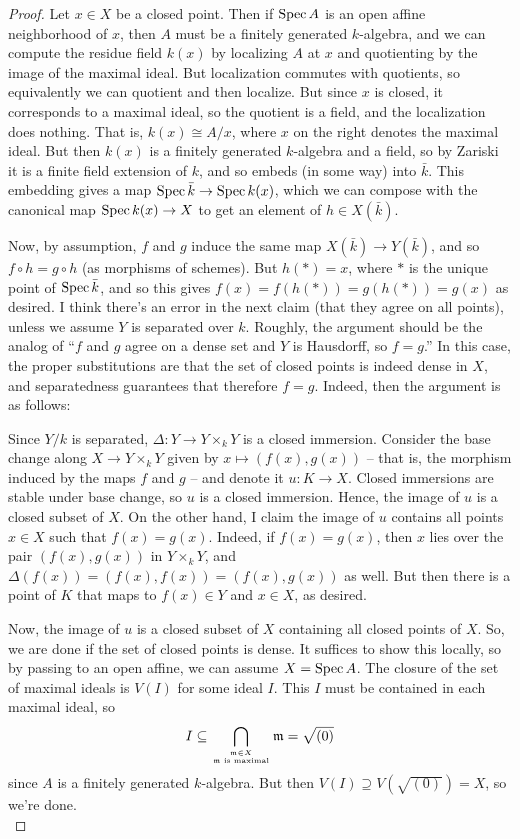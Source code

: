 \begin{proof}
	Let $x \in X$ be a closed point. Then if $\operatorname{Spec} A$ is an open affine neighborhood of $x$, then $A$ must be a finitely generated $k$-algebra, and we can compute the residue field $k(x)$ by localizing $A$ at $x$ and quotienting by the image of the maximal ideal. But localization commutes with quotients, so equivalently we can quotient and then localize. But since $x$ is closed, it corresponds to a maximal ideal, so the quotient is a field, and the localization does nothing. That is, $k(x) \cong A/x$, where $x$ on the right denotes the maximal ideal. But then $k(x)$ is a finitely generated $k$-algebra and a field, so by Zariski it is a finite field extension of $k$, and so embeds (in some way) into $\bar{k}$. This embedding gives a map $\operatorname{Spec}\bar{k} \to \operatorname{Spec} k(x)$, which we can compose with the canonical map $\operatorname{Spec} k(x) \to X$ to get an element of $h \in X(\bar{k})$.
	
	Now, by assumption, $f$ and $g$ induce the same map $X(\bar{k}) \to Y(\bar{k})$, and so $f \circ h = g \circ h$ (as morphisms of schemes). But $h(\ast) = x$, where $\ast$ is the unique point of $\operatorname{Spec}\bar{k}$, and so this gives $f(x) = f(h(\ast)) = g(h(\ast)) = g(x)$ as desired. I think there's an error in the next claim (that they agree on all points), unless we assume $Y$ is separated over $k$. Roughly, the argument should be the analog of ``$f$ and $g$ agree on a dense set and $Y$ is Hausdorff, so $f=g$.'' In this case, the proper substitutions are that the set of closed points is indeed dense in $X$, and separatedness guarantees that therefore $f=g$. Indeed, then the argument is as follows:
	
	Since $Y/k$ is separated, $\Delta : Y \to Y \times_k Y$ is a closed immersion. Consider the base change along $X \to Y \times_k Y$ given by $x \mapsto (f(x),g(x))$ -- that is, the morphism induced by the maps $f$ and $g$ -- and denote it $u : K \to X$. Closed immersions are stable under base change, so $u$ is a closed immersion. Hence, the image of $u$ is a closed subset of $X$. On the other hand, I claim the image of $u$ contains all points $x \in X$ such that $f(x) = g(x)$. Indeed, if $f(x) = g(x)$, then $x$ lies over the pair $(f(x),g(x))$ in $Y \times_k Y$, and $\Delta(f(x)) = (f(x),f(x)) = (f(x),g(x))$ as well. But then there is a point of $K$ that maps to $f(x) \in Y$ and $x \in X$, as desired.
	
	Now, the image of $u$ is a closed subset of $X$ containing all closed points of $X$. So, we are done if the set of closed points is dense. It suffices to show this locally, so by passing to an open affine, we can assume $X = \operatorname{Spec} A$. The closure of the set of maximal ideals is $V(I)$ for some ideal $I$. This $I$ must be contained in each maximal ideal, so
	\[ I \subseteq \bigcap_{\mathfrak{m} \in X \atop \mathfrak{m} \text{ is maximal}} \mathfrak{m} = \sqrt{(0)} \]
	since $A$ is a finitely generated $k$-algebra. But then $V(I) \supseteq V(\sqrt{(0)}) = X$, so we're done. \\
	

\end{proof}
